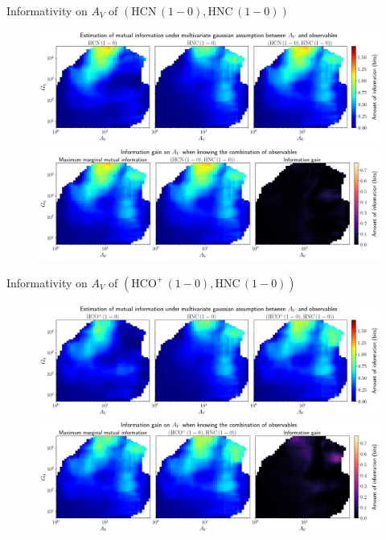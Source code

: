 \documentclass{beamer}
\begin{document}
\begin{frame}{Informativity on $A_V$ of $\left(\mathrm{HCN\,(1-0)},\mathrm{HNC\,(1-0)}\right)$}
    \begin{figure}
        \centering
        \includegraphics[width=0.95\linewidth]{../linearinfogauss/av__hcn10_hnc10_linearinfogauss.png}
        \vfill
        \includegraphics[width=0.95\linewidth]{../linearinfogauss/av__hcn10_hnc10_linearinfogauss_gain.png}
    \end{figure}
\end{frame}

\begin{frame}{Informativity on $A_V$ of $\left(\mathrm{HCO^+\,(1-0)},\mathrm{HNC\,(1-0)}\right)$}
    \begin{figure}
        \centering
        \includegraphics[width=0.95\linewidth]{../linearinfogauss/av__hcop10_hnc10_linearinfogauss.png}
        \vfill
        \includegraphics[width=0.95\linewidth]{../linearinfogauss/av__hcop10_hnc10_linearinfogauss_gain.png}
    \end{figure}
\end{frame}
\end{document}
